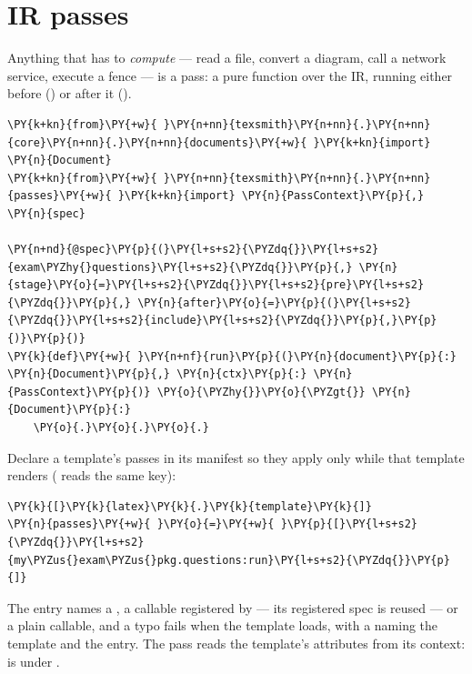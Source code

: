 \documentclass[a4paper,twoside]{article}
\begin{document}
\section{IR passes}
Anything that has to \emph{compute} --- read a file, convert a diagram, call a
network service, execute a fence --- is a pass: a pure function
 over the IR, running either before
 () or after it ().
\begin{tscode}[lang=python, engine=pygments]
\begin{Verbatim}[commandchars=\\\{\},breaklines, breakanywhere, commandchars=\\\{\}]
\PY{k+kn}{from}\PY{+w}{ }\PY{n+nn}{texsmith}\PY{n+nn}{.}\PY{n+nn}{core}\PY{n+nn}{.}\PY{n+nn}{documents}\PY{+w}{ }\PY{k+kn}{import} \PY{n}{Document}
\PY{k+kn}{from}\PY{+w}{ }\PY{n+nn}{texsmith}\PY{n+nn}{.}\PY{n+nn}{passes}\PY{+w}{ }\PY{k+kn}{import} \PY{n}{PassContext}\PY{p}{,} \PY{n}{spec}

\PY{n+nd}{@spec}\PY{p}{(}\PY{l+s+s2}{\PYZdq{}}\PY{l+s+s2}{exam\PYZhy{}questions}\PY{l+s+s2}{\PYZdq{}}\PY{p}{,} \PY{n}{stage}\PY{o}{=}\PY{l+s+s2}{\PYZdq{}}\PY{l+s+s2}{pre}\PY{l+s+s2}{\PYZdq{}}\PY{p}{,} \PY{n}{after}\PY{o}{=}\PY{p}{(}\PY{l+s+s2}{\PYZdq{}}\PY{l+s+s2}{include}\PY{l+s+s2}{\PYZdq{}}\PY{p}{,}\PY{p}{)}\PY{p}{)}
\PY{k}{def}\PY{+w}{ }\PY{n+nf}{run}\PY{p}{(}\PY{n}{document}\PY{p}{:} \PY{n}{Document}\PY{p}{,} \PY{n}{ctx}\PY{p}{:} \PY{n}{PassContext}\PY{p}{)} \PY{o}{\PYZhy{}}\PY{o}{\PYZgt{}} \PY{n}{Document}\PY{p}{:}
    \PY{o}{.}\PY{o}{.}\PY{o}{.}
\end{Verbatim}
\end{tscode}
Declare a template's passes in its manifest so they apply only while that
template renders ( reads the same key):
\begin{tscode}[lang=toml, engine=pygments]
\begin{Verbatim}[commandchars=\\\{\},breaklines, breakanywhere, commandchars=\\\{\}]
\PY{k}{[}\PY{k}{latex}\PY{k}{.}\PY{k}{template}\PY{k}{]}
\PY{n}{passes}\PY{+w}{ }\PY{o}{=}\PY{+w}{ }\PY{p}{[}\PY{l+s+s2}{\PYZdq{}}\PY{l+s+s2}{my\PYZus{}exam\PYZus{}pkg.questions:run}\PY{l+s+s2}{\PYZdq{}}\PY{p}{]}
\end{Verbatim}
\end{tscode}
The entry names a , a callable registered by  --- its
registered spec is reused --- or a plain callable, and a typo fails when the
template loads, with a  naming the template and the entry. The
pass reads the template's attributes from its context:
 is  under .
\end{document}

